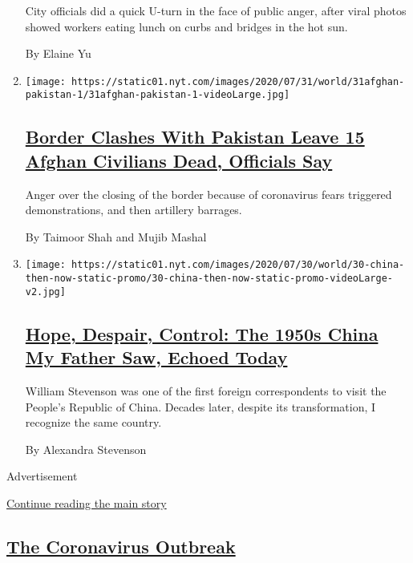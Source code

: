 \begin{enumerate}
  City officials did a quick U-turn in the face of public anger, after
  viral photos showed workers eating lunch on curbs and bridges in the
  hot sun.

  By Elaine Yu
\item
  \texttt{[image: https://static01.nyt.com/images/2020/07/31/world/31afghan-pakistan-1/31afghan-pakistan-1-videoLarge.jpg]}

  \hypertarget{border-clashes-with-pakistan-leave-15-afghan-civilians-dead-officials-say}{%
  \subsection{\texorpdfstring{\href{/2020/07/31/world/asia/afghanistan-pakistan-border.html}{Border
  Clashes With Pakistan Leave 15 Afghan Civilians Dead, Officials
  Say}}{Border Clashes With Pakistan Leave 15 Afghan Civilians Dead, Officials Say}}\label{border-clashes-with-pakistan-leave-15-afghan-civilians-dead-officials-say}}

  Anger over the closing of the border because of coronavirus fears
  triggered demonstrations, and then artillery barrages.

  By Taimoor Shah and Mujib Mashal
\item
  \texttt{[image: https://static01.nyt.com/images/2020/07/30/world/30-china-then-now-static-promo/30-china-then-now-static-promo-videoLarge-v2.jpg]}

  \hypertarget{hope-despair-control-the-1950s-china-my-father-saw-echoed-today}{%
  \subsection{\texorpdfstring{\href{/interactive/2020/07/30/world/asia/china-1950s-echoed-today.html}{Hope,
  Despair, Control: The 1950s China My Father Saw, Echoed
  Today}}{Hope, Despair, Control: The 1950s China My Father Saw, Echoed Today}}\label{hope-despair-control-the-1950s-china-my-father-saw-echoed-today}}

  William Stevenson was one of the first foreign correspondents to visit
  the People's Republic of China. Decades later, despite its
  transformation, I recognize the same country.

  By Alexandra Stevenson
\end{enumerate}

Advertisement

\protect\hyperlink{after-mid1}{Continue reading the main story}

\hypertarget{the-coronavirus-outbreak}{%
\subsection{\texorpdfstring{\href{/news-event/coronavirus}{The
Coronavirus
Outbreak}}{The Coronavirus Outbreak}}\label{the-coronavirus-outbreak}}

